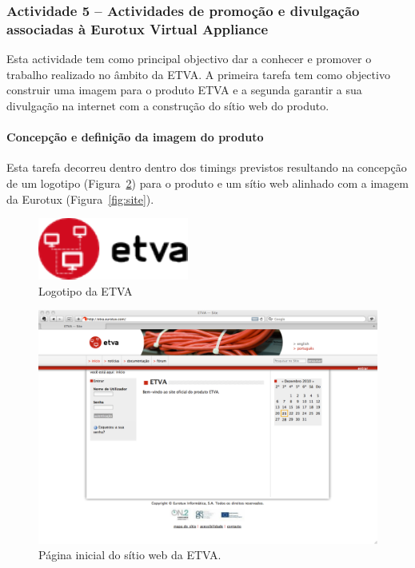 \documentclass[a4paper,12pt,portugues]{article}
\begin{document}
\subsubsection{Actividade 5 – Actividades de promoção e divulgação associadas à Eurotux Virtual Appliance}


Esta actividade tem como principal objectivo dar a conhecer e promover o
trabalho realizado no âmbito da ETVA. A primeira tarefa tem como objectivo
construir uma imagem para o produto ETVA e a segunda garantir a sua divulgação
na internet com a construção do sítio web do produto.

\paragraph{Concepção e definição da imagem do produto}

Esta tarefa decorreu dentro dentro dos timings previstos resultando na
concepção de um logotipo (Figura~\ref{fig:logo}) para o produto e um sítio web alinhado com a imagem
da Eurotux (Figura~\ref{fig:site}).

\begin{figure}[htbp]
	\centering
		\includegraphics[scale=.65]{logo}
	\caption{Logotipo da ETVA}
	\label{fig:logo}
\end{figure}

\begin{figure}[htbp]
	\centering
		\includegraphics[scale=.35]{site}
	\caption{Página inicial do sítio web da ETVA.}
	\label{fig:logo}
\end{figure}
\end{document}
